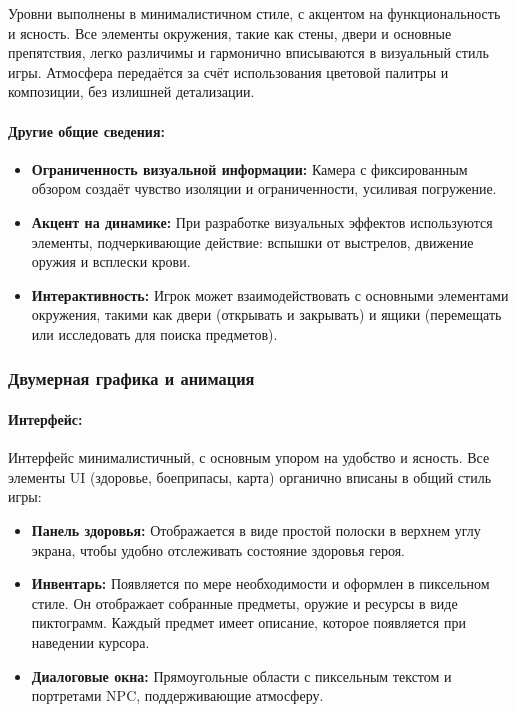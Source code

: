 \documentclass[12pt]{article}
\begin{document}
        Уровни выполнены в минималистичном стиле, с акцентом на функциональность и ясность. Все элементы окружения, такие как стены, двери и основные препятствия, легко различимы и гармонично вписываются в визуальный стиль игры. Атмосфера передаётся за счёт использования цветовой палитры и композиции, без излишней детализации.
        
        \paragraph{Другие общие сведения:} 
        \begin{itemize}
            \item \textbf{Ограниченность визуальной информации:} Камера с фиксированным обзором создаёт чувство изоляции и ограниченности, усиливая погружение.
            \item \textbf{Акцент на динамике:} При разработке визуальных эффектов используются элементы, подчеркивающие действие: вспышки от выстрелов, движение оружия и всплески крови.
            \item \textbf{Интерактивность:} Игрок может взаимодействовать с основными элементами окружения, такими как двери (открывать и закрывать) и ящики (перемещать или исследовать для поиска предметов). 
        \end{itemize}
        
    \subsubsection{Двумерная графика и анимация}
        \paragraph{Интерфейс:} 
        Интерфейс минималистичный, с основным упором на удобство и ясность. Все элементы UI (здоровье, боеприпасы, карта) органично вписаны в общий стиль игры:
        \begin{itemize}
            \item \textbf{Панель здоровья:} Отображается в виде простой полоски в верхнем углу экрана, чтобы удобно отслеживать состояние здоровья героя.
            \item \textbf{Инвентарь:} Появляется по мере необходимости и оформлен в пиксельном стиле. Он отображает собранные предметы, оружие и ресурсы в виде пиктограмм. Каждый предмет имеет описание, которое появляется при наведении курсора.
            \item \textbf{Диалоговые окна:} Прямоугольные области с пиксельным текстом и портретами NPC, поддерживающие атмосферу.
        \end{itemize}
        
\end{document}
